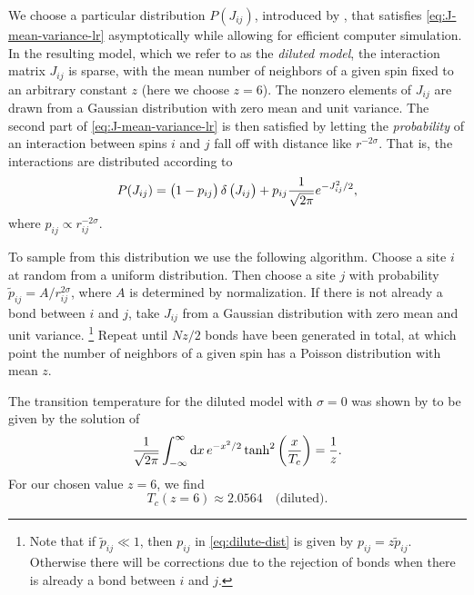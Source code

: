 We choose a particular distribution $P(J_{ij})$, introduced by
\textcite{leuzzi2008dilute}, that satisfies \cref{eq:J-mean-variance-lr}
asymptotically while allowing for efficient computer simulation. In the
resulting model, which we refer to as the \emph{diluted model}, the interaction
matrix $J_{ij}$ is sparse, with the mean number of neighbors of a given spin
fixed to an arbitrary constant $z$ (here we choose $z=6$). The nonzero elements
of $J_{ij}$ are drawn from a Gaussian distribution with zero mean and unit
variance. The second part of \cref{eq:J-mean-variance-lr} is then satisfied by
letting the \emph{probability} of an interaction between spins $i$ and $j$ fall
off with distance like $r^{-2\sigma}$. That is, the interactions are
distributed according to
\begin{equation}
  P(J_{ij})
  = \left(1 - p_{ij}\right) \delta \left(J_{ij}\right)
  + p_{ij} \frac{1}{\sqrt{2\pi}} e^{-J_{ij}^2/2},
  \label{eq:dilute-dist}
\end{equation}
where $p_{ij} \propto r_{ij}^{-2\sigma}$.

To sample from this distribution we use the following algorithm. Choose a site
$i$ at random from a uniform distribution. Then choose a site $j$ with
probability $\widetilde{p}_{ij}=A/r_{ij}^{2\sigma}$, where $A$ is determined by
normalization. If there is not already a bond between $i$ and $j$, take
$J_{ij}$ from a Gaussian distribution with zero mean and unit variance.%
\footnote{
  Note that if $\widetilde{p}_{ij} \ll 1$, then $p_{ij}$ in
  \cref{eq:dilute-dist} is given by $p_{ij} = z \widetilde{p}_{ij}$. Otherwise
  there will be corrections due to the rejection of bonds when there is already
  a bond between $i$ and $j$.
}
Repeat until $Nz/2$ bonds have been generated in total, at which point the
number of neighbors of a given spin has a Poisson distribution with mean $z$.

The transition temperature for the diluted model with $\sigma=0$ was shown by
\textcite{viana1985phase} to be given by the solution of
\begin{equation}
  \frac{1}{\sqrt{2\pi}}
  \int_{-\infty}^{\infty} \mathop{}\!\mathrm{d} x \, e^{-x^2/2} \tanh^2 \left(\frac{x}{T_c}\right)
  = \frac{1}{z}.
  \label{eq:viana-bray-Tc}
\end{equation}
For our chosen value $z=6$, we find
\begin{equation}
  T_c(z=6) \approx 2.0564 \quad\text{(diluted)}.
  \label{eq:viana-bray-Tc-z6}
\end{equation}

